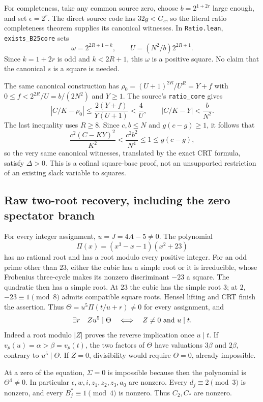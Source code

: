 For completeness, take any common source zero, choose
$b=2^{1+2r}$ large enough, and set $\epsilon=2^r$. The direct source code
has $32g<G_c$, so the literal ratio completeness theorem supplies its
canonical witnesses. In \texttt{Ratio.lean}, \texttt{exists\_B25core} sets
\[
 \omega=2^{2R+1-k},\qquad U=(N^2/b)2^{2R+1}.
\]
Since $k=1+2r$ is odd and $k<2R+1$, this $\omega$ is a positive square.
No claim that the canonical $s$ is a square is needed.

The same canonical construction has
$\rho_0=(U+1)^{2R}/U^R=Y+f$ with
$0\le f<2^{2R}/U=b/(2N^2)$ and $Y\ge1$.
The source's \texttt{ratio\_core} gives
\[
 |C/K-\rho_0|\le\frac{2(Y+f)}{Y(U+1)}<\frac4U,
 \qquad |C/K-Y|<\frac b{N^2}.
\]
The last inequality uses $R\ge8$. Since $c,b\le N$ and
$g(c-g)\ge1$, it follows that
\[
 \frac{c^2(C-KY)^2}{K^2}<\frac{c^2b^2}{N^4}\le1\le g(c-g),
\]
so the very same canonical witnesses, translated by the exact CRT formula, satisfy $\Delta>0$.
This is a cofinal square-base proof, not an unsupported restriction of an
existing slack variable to squares.

\subsection{Raw two-root recovery, including the zero spectator branch}
For every integer assignment, $u=J=4A-5\ne0$. The polynomial
\[
 \Pi(x)=(x^3-x-1)(x^2+23)
\]
has no rational root and has a root modulo every positive integer.
For an odd prime other than $23$, either the cubic has a simple root or it
is irreducible, whose Frobenius three-cycle makes its nonzero discriminant
$-23$ a square. The quadratic then has a simple root. At $23$ the cubic has
the simple root $3$; at $2$, $-23\equiv1\pmod8$ admits compatible square
roots. Hensel lifting and CRT finish the assertion. Thus
$\Theta=u^5\Pi(t/u+r)\ne0$ for every assignment, and
\[
 \exists r\quad Zu^5\mid\Theta
 \quad\Longleftrightarrow\quad Z\ne0\ \hbox{and}\ u\mid t.
\]
Indeed a root modulo $|Z|$ proves the reverse implication once $u\mid t$.
If $v_p(u)=\alpha>\beta=v_p(t)$, the two factors of $\Theta$ have
valuations $3\beta$ and $2\beta$, contrary to $u^5\mid\Theta$.
If $Z=0$, divisibility would require $\Theta=0$, already impossible.

At a zero of the equation, $\Sigma=0$ is impossible because then the
polynomial is $\Theta^4\ne0$. In particular
$\epsilon,w,i,z_1,z_2,z_3,a_0$ are nonzero. Every $d_j\equiv2\pmod3$
is nonzero, and every $B_j^*\equiv1\pmod4$ is nonzero. Thus $C_2,C_*$
are nonzero.

